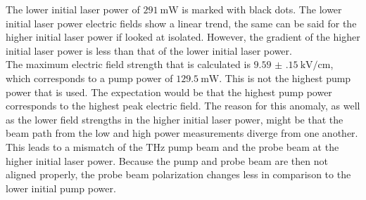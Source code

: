 The lower initial laser power of $\SI{291}{\milli\W}$ is marked with black dots.
The lower initial laser power electric fields show a linear trend, the same can be said for the higher initial laser power if looked at isolated.
However, the gradient of the higher initial laser power is less than that of the lower initial laser power.
\\
The maximum electric field strength that is calculated is $\SI{9.59(15)}{\kilo\V\per\centi\meter}$, which corresponds to a pump power of $\SI{129.5}{\milli\W}$.
This is not the highest pump power that is used.
The expectation would be that the highest pump power corresponds to the highest peak electric field.
The reason for this anomaly, as well as the lower field strengths in the higher initial laser power, might be that the beam path from the low and high power measurements diverge from one another.
This leads to a mismatch of the $\si{\tera\hertz}$ pump beam and the probe beam at the higher initial laser power.
Because the pump and probe beam are then not aligned properly, the probe beam polarization changes less in comparison to the lower initial pump power.

\FloatBarrier
